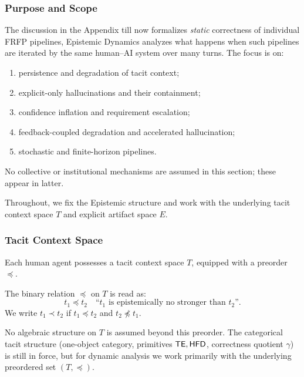 

\subsubsection{Purpose and Scope}
The discussion in the Appendix till now formalizes
\emph{static} correctness of individual FRFP pipelines, Epistemic Dynamics
analyzes what happens when such pipelines are iterated by the same
human--AI system over many turns. The focus is on:
\begin{enumerate}
  \item persistence and degradation of tacit context;
  \item explicit-only hallucinations and their containment;
  \item confidence inflation and requirement escalation;
  \item feedback-coupled degradation and accelerated hallucination;
  \item stochastic and finite-horizon pipelines.
\end{enumerate}
No collective or institutional mechanisms are assumed in this section;
these appear in latter.

Throughout, we fix the Epistemic structure and work
with the underlying tacit context space \(T\) and explicit artifact
space \(E\).

\subsubsection{Tacit Context Space}

Each human agent possesses a tacit context space \(T\), equipped with a
preorder \(\preceq\).

\begin{definition}
The binary relation \(\preceq\) on \(T\) is read as:
\[
t_1 \preceq t_2
\quad\text{``\(t_1\) is epistemically no stronger than \(t_2\)''}.
\]
We write \(t_1 \prec t_2\) if \(t_1 \preceq t_2\) and \(t_2 \not\preceq t_1\).
\end{definition}

No algebraic structure on \(T\) is assumed beyond this preorder. The
categorical tacit structure  (one-object category,
primitives \(\mathsf{TE},\mathsf{HFD}\), correctness quotient \(\gamma\)) is still in
force, but for dynamic analysis we work primarily with the underlying
preordered set \((T,\preceq)\).

